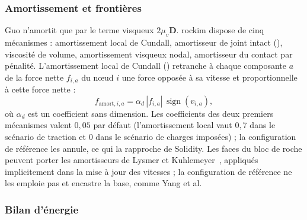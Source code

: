 \subsubsection{Amortissement et frontières}

Guo n'amortit que par le terme visqueux $2\mu_v\mathbf D$. rockim dispose de cinq mécanismes : amortissement local de Cundall, amortisseur de joint intact (), viscosité de volume, amortissement visqueux nodal, amortisseur du contact par pénalité. L'amortissement local de Cundall () retranche à chaque composante $a$ de la force nette $f_{i,a}$ du nœud $i$ une force opposée à sa vitesse et proportionnelle à cette force nette :
\begin{equation}
f_{\text{amort},i,a} = \alpha_d\,|f_{i,a}|\,\operatorname{sign}(v_{i,a}) ,
\label{eq-cundall}
\end{equation}
où $\alpha_d$ est un coefficient sans dimension. Les coefficients des deux premiers mécanismes valent $0{,}05$ par défaut (l'amortissement local vaut $0{,}7$ dans le scénario de traction et 0 dans le scénario de charges imposées) ; la configuration de référence les annule, ce qui la rapproche de Solidity. Les faces du bloc de roche peuvent porter les amortisseurs de Lysmer et Kuhlemeyer~\cite{lysmer1969}, appliqués implicitement dans la mise à jour des vitesses ; la configuration de référence ne les emploie pas et encastre la base, comme Yang et al.

\subsubsection{Bilan d'énergie}
\label{sec-B4}

